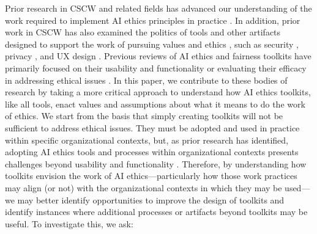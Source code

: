 \documentclass[acmsmall]{acmart}
\begin{document}
Prior research in CSCW and related fields has advanced our understanding of the work required to implement AI ethics principles in practice \cite[e.g.,][]{rakova2021responsible, madaio2020co,Holstein:2019fr,passi2019problem,madaio2022assessing}. %
In addition, prior work in CSCW has also examined the politics of tools and other artifacts designed to support the work of pursuing values and ethics \cite{Shilton2014HowToSeeValues,wong2020beyondchecklists}, such as security \cite{pierce2018differential}, privacy \cite{shilton2020rolepplaying,luger2015playing}, and UX design \cite[e.g.,][]{chivukula2021surveying}. 
Previous reviews of AI ethics and fairness toolkits have primarily focused on their usability and functionality \cite[e.g.,][]{lee2021landscape, richardson2021towards,deng2022exploring} or evaluating their efficacy in addressing ethical issues \cite[e.g.,][]{boyd2021datasheets}. In this paper, we contribute to these bodies of research by taking a more critical approach to understand how AI ethics toolkits, like all tools, enact values and assumptions about what it means to do the work of ethics. We start from the basis that simply creating toolkits will not be sufficient to address ethical issues. They must be adopted and used in practice within specific organizational contexts, but, as prior research has identified, adopting AI ethics tools and processes within organizational contexts presents challenges beyond usability and functionality  \cite[e.g.,][]{madaio2020co,rakova2021responsible,deng2022exploring,madaio2022assessing}. Therefore, by understanding how toolkits envision the work of AI ethics---particularly how those work practices may align (or not) with the organizational contexts in which they may be used---we may better identify opportunities to improve the design of toolkits and identify instances where additional processes or artifacts beyond toolkits may be useful. To investigate this, we ask: 
\end{document}
